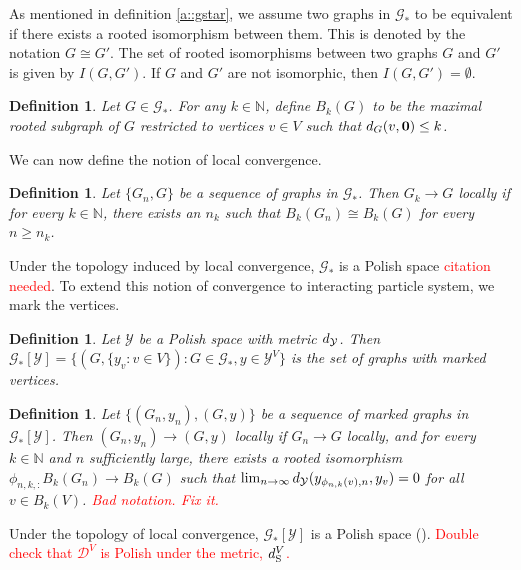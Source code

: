 \documentclass[12pt]{article}
\newcommand{\mb}{\mathbb}
\newcommand{\mc}{\mathcal}
\newcommand{\ra}{\rightarrow}
\newcommand{\te}{\text}
\newcommand{\tr}{\textcolor{red}}
\newcommand{\cad}{\mc{D}}							%
\renewcommand{\root}{\mathbf{0}}					%
\newcommand{\stmet}[1]{
\ifstrempty{#1}{
	d_{\te{S}}}{
	d_{\te{S},#1}}}									%
\newcommand{\xg}{y}									%
\newcommand{\met}[2]{
\ifstrempty{#2}{
	d_{#1}}{
	d_{#1,#2}}}										%
\newcommand{\vind}[1]{_{#1}}						%
\newcommand{\vpara}[1]{^{#1}}						%
\newcommand{\Gs}{\mc{G}_\ast}						%
\newcommand{\iso}{I}								%
\newcommand{\trnc}[1]{B_{#1}}						%
\newcommand{\spce}{\mc{Y}}							%
\renewcommand{\sp}[1]{[#1]}							%
\newcommand{\dit}[2]{_{#1,#2}}						%
\newcommand{\vindit}[2]{_{#1,#2}}					%
\renewcommand{\it}[1]{_{#1}}						%
\newtheorem{defn}[thms]{Definition}
\begin{document}
As mentioned in definition \ref{a::gstar}, we assume two graphs in \(\Gs\) to be equivalent if there exists a rooted isomorphism between them. This is denoted by the notation \(G \cong G'\). The set of rooted isomorphisms between two graphs \(G\) and \(G'\) is given by \(\iso(G,G')\). If \(G\) and \(G'\) are not isomorphic, then \(\iso(G,G') = \emptyset\).

\begin{defn}
Let \(G \in \Gs\). For any \(k \in \mb{N}\), define \(\trnc{k}(G)\) to be the maximal rooted subgraph of \(G\) restricted to vertices \(v \in V\) such that \(\met{G}{}(v,\root) \leq k\).
\label{lwc::trnc}
\end{defn}

We can now define the notion of local convergence.

\begin{defn}
Let \(\{G\it{n},G\}\) be a sequence of graphs in \(\Gs\). Then \(G\it{k} \ra G\) locally if for every \(k \in \mb{N}\), there exists an \(n_k\) such that \(\trnc{k}(G\it{n}) \cong \trnc{k}(G)\) for every \(n \geq n_k\).
\label{lwc::lc}
\end{defn}

Under the topology induced by local convergence, \(\Gs\) is a Polish space \tr{citation needed}. To extend this notion of convergence to interacting particle system, we mark the vertices.

\begin{defn}
Let \(\spce\) be a Polish space with metric \(\met{\spce}{}\). Then \(\Gs\sp{\spce} = \{(G,\{\xg\vind{v}:v \in V\}): G \in \Gs, \xg\in \spce^V\}\) is the set of graphs with marked vertices.
\label{lwc::marked}
\end{defn}

\begin{defn}
Let \(\{(G\it{n},\xg\it{n}),(G,\xg)\}\) be a sequence of marked graphs in \(\Gs\sp{\spce}\). Then \((G\it{n},\xg\it{n}) \ra (G,\xg)\) locally if \(G\it{n} \ra G\) locally, and for every \(k \in \mb{N}\) and \(n\) sufficiently large, there exists a rooted isomorphism \(\phi\dit{n,k}:\trnc{k}(G\it{n}) \ra \trnc{k}(G)\) such that \(\lim_{n\ra\infty} \met{\spce}{}(\xg\vindit{\phi\dit{n}{k}(v)}{n},\xg\vind{v}) = 0\) for all \(v \in \trnc{k}(V)\). \tr{Bad notation. Fix it.}
\label{lwc::mlc}
\end{defn}

Under the topology of local convergence, \(\Gs\sp{\spce}\) is a Polish space (\cite[Lemmas A.2, A.3, and A.5]{LacRamWu19}). \tr{Double check that \(\cad^V\) is Polish under the metric, \(\stmet{}\vpara{V}\).}
\end{document}
